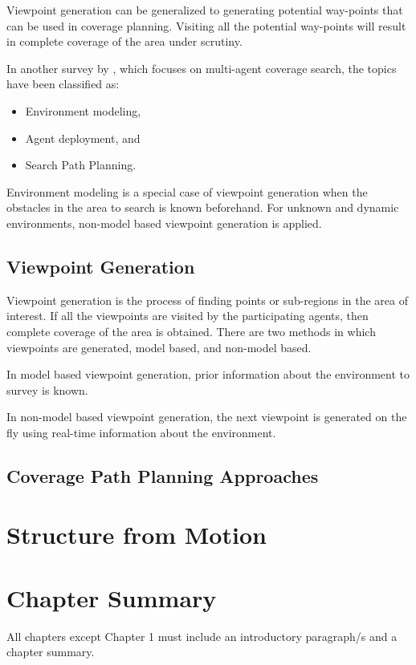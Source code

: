 Viewpoint generation can be generalized to generating potential way-points that can be used in coverage planning. Visiting all the  potential way-points will result in complete coverage of the area under scrutiny.

In another survey by , which focuses on multi-agent coverage search, the topics have been classified as:
\begin{itemize}
	\item Environment modeling,
	\item Agent deployment, and
	\item Search Path Planning.
\end{itemize}

Environment modeling is a special case of viewpoint generation when the obstacles in the area to search is known beforehand. For unknown and dynamic environments, non-model based viewpoint generation is applied.

\subsection{Viewpoint Generation}

Viewpoint generation is the process of finding points or sub-regions in the area of interest. If all the viewpoints are visited by the participating agents, then complete coverage of the area is obtained. There are two methods in which viewpoints are generated, model based, and non-model based.

In model based viewpoint generation, prior information about the environment to survey is known.

In non-model based viewpoint generation, the next viewpoint is generated on the fly using real-time information about the environment.


\subsection{Coverage Path Planning Approaches}











\section{Structure from Motion}


\section{Chapter Summary}
All chapters except Chapter 1 must include an introductory paragraph/s and a chapter summary.

\FloatBarrier

